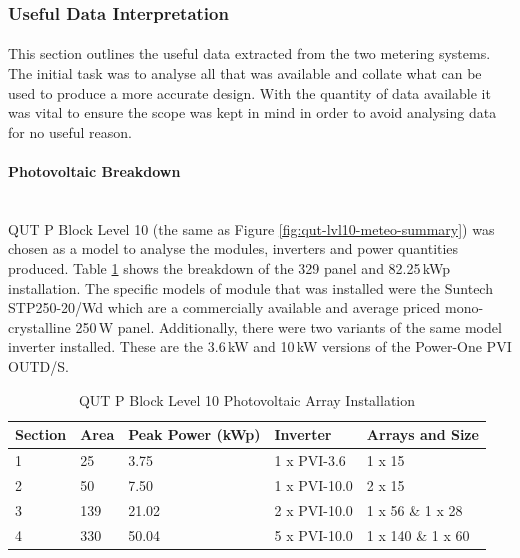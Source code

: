 \subsubsection{Useful Data Interpretation}

\paragraph{}
This section outlines the useful data extracted from the two metering systems. The initial task was to analyse all that was available and collate what can be used to produce a more accurate design. With the quantity of data available it was vital to ensure the scope was kept in mind in order to avoid analysing data for no useful reason. 

\paragraph{Photovoltaic Breakdown}
~\\
QUT P Block Level 10 (the same as Figure \ref{fig:qut-lvl10-meteo-summary}) was chosen as a model to analyse the modules, inverters and power quantities produced. Table \ref{table:qut-pblock-lvl10-pv-breakdown} shows the breakdown of the 329 panel and 82.25\,kWp installation. The specific models of module that was installed were the Suntech STP250-20/Wd which are a commercially available and average priced mono-crystalline 250\,W panel. Additionally, there were two variants of the same model inverter installed. These are the 3.6\,kW and 10\,kW versions of the Power-One PVI OUTD/S.        

\begin{table}[H]
	\centering
	\begin{tabular}{|l|l|l|l|l|}
		\hline
		\textbf{Section} & \textbf{Area} & \textbf{Peak Power (kWp)} & \textbf{Inverter} & \textbf{Arrays and Size} \\ \hline
		1                & 25                                  & 3.75                      & 1 x PVI-3.6       & 1 x 15                   \\ \hline
		2                & 50                                  & 7.50                      & 1 x PVI-10.0      & 2 x 15                   \\ \hline
		3                & 139                                 & 21.02                     & 2 x PVI-10.0      & 1 x 56 \& 1 x 28         \\ \hline
		4                & 330                                 & 50.04                     & 5 x PVI-10.0      & 1 x 140 \& 1 x 60        \\ \hline
	\end{tabular}
\caption{QUT P Block Level 10 Photovoltaic Array Installation}
\label{table:qut-pblock-lvl10-pv-breakdown}
\end{table}

